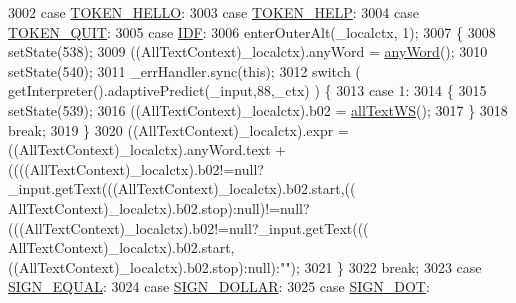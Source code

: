 \begin{DoxyCode}
3002       \textcolor{keywordflow}{case} \hyperlink{classgov_1_1nasa_1_1jpf_1_1inspector_1_1client_1_1parser_1_1_console_grammar_parser_a02654226879b17f8ee3fc4508bacb0e0}{TOKEN\_HELLO}:
3003       \textcolor{keywordflow}{case} \hyperlink{classgov_1_1nasa_1_1jpf_1_1inspector_1_1client_1_1parser_1_1_console_grammar_parser_a8acc93fe5d687353ad83d5b6b7af39dd}{TOKEN\_HELP}:
3004       \textcolor{keywordflow}{case} \hyperlink{classgov_1_1nasa_1_1jpf_1_1inspector_1_1client_1_1parser_1_1_console_grammar_parser_a50c90ab80070963c445793482e90700e}{TOKEN\_QUIT}:
3005       \textcolor{keywordflow}{case} \hyperlink{classgov_1_1nasa_1_1jpf_1_1inspector_1_1client_1_1parser_1_1_console_grammar_parser_ae9d41d0f0abda3e06c7f452164d2e3a0}{IDF}:
3006         enterOuterAlt(\_localctx, 1);
3007         \{
3008         setState(538);
3009         ((AllTextContext)\_localctx).anyWord = \hyperlink{classgov_1_1nasa_1_1jpf_1_1inspector_1_1client_1_1parser_1_1_console_grammar_parser_a33a50c0e5499145e26945de763b14c70}{anyWord}();
3010         setState(540);
3011         \_errHandler.sync(\textcolor{keyword}{this});
3012         \textcolor{keywordflow}{switch} ( getInterpreter().adaptivePredict(\_input,88,\_ctx) ) \{
3013         \textcolor{keywordflow}{case} 1:
3014           \{
3015           setState(539);
3016           ((AllTextContext)\_localctx).b02 = \hyperlink{classgov_1_1nasa_1_1jpf_1_1inspector_1_1client_1_1parser_1_1_console_grammar_parser_adc161fc81eedd939154fd25e889f5b28}{allTextWS}();
3017           \}
3018           \textcolor{keywordflow}{break};
3019         \}
3020          ((AllTextContext)\_localctx).expr =  ((AllTextContext)\_localctx).anyWord.text +                    
              ((((AllTextContext)\_localctx).b02!=null?\_input.getText(((AllTextContext)\_localctx).b02.start,((
      AllTextContext)\_localctx).b02.stop):null)!=null?(((AllTextContext)\_localctx).b02!=null?\_input.getText(((
      AllTextContext)\_localctx).b02.start,((AllTextContext)\_localctx).b02.stop):null):\textcolor{stringliteral}{""}); 
3021         \}
3022         \textcolor{keywordflow}{break};
3023       \textcolor{keywordflow}{case} \hyperlink{classgov_1_1nasa_1_1jpf_1_1inspector_1_1client_1_1parser_1_1_console_grammar_parser_aa20156acc053ae99f46688b4669b5fed}{SIGN\_EQUAL}:
3024       \textcolor{keywordflow}{case} \hyperlink{classgov_1_1nasa_1_1jpf_1_1inspector_1_1client_1_1parser_1_1_console_grammar_parser_a04caa506d8df430fcc630be094680098}{SIGN\_DOLLAR}:
3025       \textcolor{keywordflow}{case} \hyperlink{classgov_1_1nasa_1_1jpf_1_1inspector_1_1client_1_1parser_1_1_console_grammar_parser_a7c2c9459d2cd462873192e1950dc5a6c}{SIGN\_DOT}:

\end{DoxyCode}
